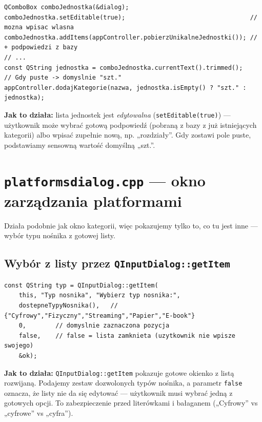 \documentclass[11pt,a4paper]{article}
\begin{document}
\begin{lstlisting}[caption={Podpowiedzi z bazy, ale można wpisać własną}]
QComboBox comboJednostka(&dialog);
comboJednostka.setEditable(true);                                  // mozna wpisac wlasna
comboJednostka.addItems(appController.pobierzUnikalneJednostki()); // + podpowiedzi z bazy
// ...
const QString jednostka = comboJednostka.currentText().trimmed();
// Gdy puste -> domyslnie "szt."
appController.dodajKategorie(nazwa, jednostka.isEmpty() ? "szt." : jednostka);
\end{lstlisting}

\textbf{Jak to działa:} lista jednostek jest \emph{edytowalna}
(\texttt{setEditable(true)}) --- użytkownik może wybrać gotową podpowiedź
(pobraną z bazy z już istniejących kategorii) albo wpisać zupełnie nową, np.
„rozdziały”. Gdy zostawi pole puste, podstawiamy sensowną wartość domyślną „szt.”.

\section{\texttt{platformsdialog.cpp} --- okno zarządzania platformami}

Działa podobnie jak okno kategorii, więc pokazujemy tylko to, co tu jest inne ---
wybór typu nośnika z gotowej listy.

\subsection{Wybór z listy przez \texttt{QInputDialog::getItem}}

\begin{lstlisting}[caption={Gotowa lista rozwijana zamiast wpisywania}]
const QString typ = QInputDialog::getItem(
    this, "Typ nosnika", "Wybierz typ nosnika:",
    dostepneTypyNosnika(),   // {"Cyfrowy","Fizyczny","Streaming","Papier","E-book"}
    0,        // domyslnie zaznaczona pozycja
    false,    // false = lista zamknieta (uzytkownik nie wpisze swojego)
    &ok);
\end{lstlisting}

\textbf{Jak to działa:} \texttt{QInputDialog::getItem} pokazuje gotowe okienko
z listą rozwijaną. Podajemy zestaw dozwolonych typów nośnika, a parametr
\texttt{false} oznacza, że listy nie da się edytować --- użytkownik musi wybrać
jedną z gotowych opcji. To zabezpieczenie przed literówkami i bałaganem
(„Cyfrowy” vs „cyfrowe” vs „cyfra”).
\end{document}
